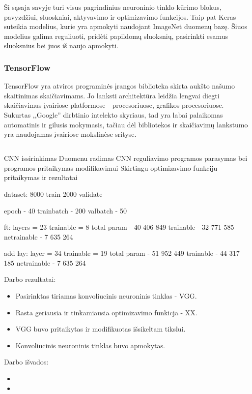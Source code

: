 \documentclass{VUMIFPSkursinis}
\begin{document}
Ši sąsaja savyje turi visus pagrindinius neuroninio tinklo kūrimo blokus, pavyzdžiui, sluoskniai, aktyvavimo ir optimizavimo funkcijos. Taip pat Keras suteikia modelius, 
kurie yra apmokyti naudojant ImageNet duomenų bazę. Šiuos modelius galima reguliuoti, pridėti papildomų sluoksnių, pasirinkti esamus sluoksnius bei juos iš naujo apmokyti.

\subsubsection{TensorFlow}
TensorFlow yra atviros programinės įrangos biblioteka skirta aukšto našumo skaitinimas skaičiavimams. Jo lanksti architektūra leidžia lengvai diegti skaičiavimus įvairiose 
platformose - procesoriuose, grafikos procesoriuose. Sukurtas ,,Google'' dirbtinio intelekto skyriaus, tad yra labai palaikomas automatinis ir gilusis mokymasis, tačiau 
dėl bibliotekos ir skaičiavimų lankstumo yra naudojamas įvairiose mokslinėse srityse.

\subsection{}
CNN issirinkimas
Duomenu radimas
CNN reguliavimo programos parasymas
bei programos pritaikymas modifikavimui
Skirtingu optimizavimo funkciju pritaikymas ir rezultatai


dataset:
8000 train
2000 validate

epoch - 40
trainbatch - 200
valbatch - 50

ft:
layers = 23
trainable = 8
total param - 40 406 849
trainable - 32 771 585
netrainable - 7 635 264

add lay:
layer = 34 
trainable = 19
total param - 51 952 449
trainable - 44 317 185
netrainable - 7 635 264

Darbo rezultatai:
\begin{itemize}
\item Pasirinktas tiriamas konvoliucinis neuroninis tinklas - VGG.
\item Rasta geriausia ir tinkamiausia optimizavimo funkicja - XX.
\item VGG buvo pritaikytas ir modifikuotas išsikeltam tikslui.
\item Konvoliucinis neuroninis tinklas buvo apmokytas.
\end{itemize}


Darbo išvados:
\begin{itemize}
\item 
\item
\end{itemize}

\printbibliography[heading=bibintoc] 
\end{document}
